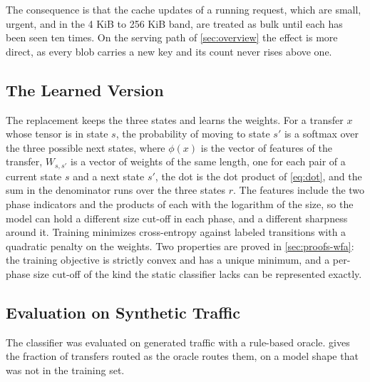 The consequence is that the cache updates of a running request, which are
small, urgent, and in the 4 KiB to 256 KiB band, are treated as bulk until
each has been seen ten times. On the serving path of \cref{sec:overview} the
effect is more direct, as every blob carries a new key and its count never
rises above one.

\subsection{The Learned Version}

The replacement keeps the three states and learns the weights. For a transfer
$x$ whose tensor is in state $s$, the probability of moving to state $s'$ is
a softmax over the three possible next states,
where $\phi(x)$ is the vector of features of the transfer, $W_{s,s'}$ is a
vector of weights of the same length, one for each pair of a current state
$s$ and a next state $s'$, the dot is the dot product of \cref{eq:dot}, and
the sum in the denominator runs over the three states $r$. The features include
the two phase indicators and the products of each with the logarithm of the
size, so the model can hold a different size cut-off in each phase, and a
different sharpness around it. Training minimizes cross-entropy against
labeled transitions with a quadratic penalty on the weights. Two properties
are proved in \cref{sec:proofs-wfa}: the training objective is strictly convex
and has a unique minimum, and a per-phase size cut-off of the kind the static
classifier lacks can be represented exactly.

\subsection{Evaluation on Synthetic Traffic}

The classifier was evaluated on generated traffic with a rule-based oracle.  gives the fraction
of transfers routed as the oracle routes them, on a model shape that was not
 in the training set.

